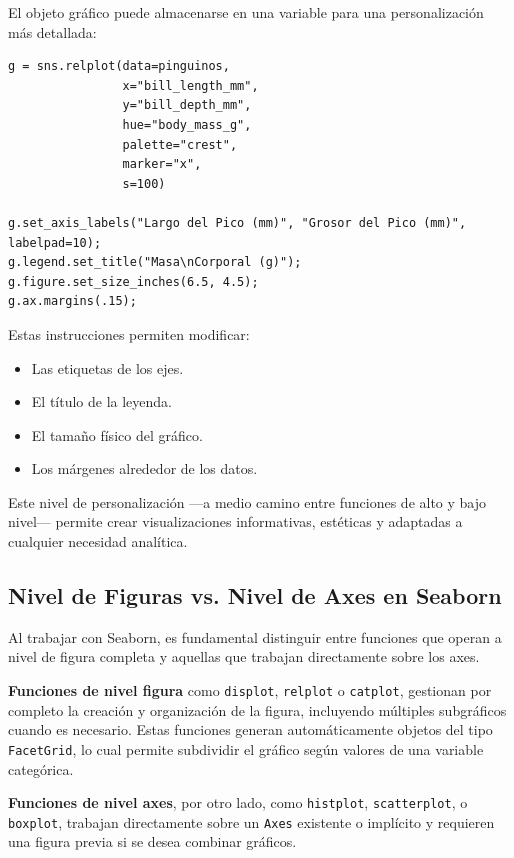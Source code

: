 \documentclass{article}
\theoremstyle{nonumberplain}
\begin{document}
El objeto gráfico puede almacenarse en una variable para una personalización más detallada:

\begin{verbatim}
g = sns.relplot(data=pinguinos,
                x="bill_length_mm",
                y="bill_depth_mm",
                hue="body_mass_g",
                palette="crest",
                marker="x",
                s=100)

g.set_axis_labels("Largo del Pico (mm)", "Grosor del Pico (mm)", labelpad=10);
g.legend.set_title("Masa\nCorporal (g)");
g.figure.set_size_inches(6.5, 4.5);
g.ax.margins(.15);
\end{verbatim}

Estas instrucciones permiten modificar:
\begin{itemize}
    \item Las etiquetas de los ejes.
    \item El título de la leyenda.
    \item El tamaño físico del gráfico.
    \item Los márgenes alrededor de los datos.
\end{itemize}

Este nivel de personalización —a medio camino entre funciones de alto y bajo nivel— permite crear visualizaciones informativas, estéticas y adaptadas a cualquier necesidad analítica.

\subsection*{Nivel de Figuras vs. Nivel de Axes en Seaborn}

Al trabajar con Seaborn, es fundamental distinguir entre funciones que operan a nivel de figura completa y aquellas que trabajan directamente sobre los axes.

\textbf{Funciones de nivel figura} como \texttt{displot}, \texttt{relplot} o \texttt{catplot}, gestionan por completo la creación y organización de la figura, incluyendo múltiples subgráficos cuando es necesario. Estas funciones generan automáticamente objetos del tipo \texttt{FacetGrid}, lo cual permite subdividir el gráfico según valores de una variable categórica.

\textbf{Funciones de nivel axes}, por otro lado, como \texttt{histplot}, \texttt{scatterplot}, o \texttt{boxplot}, trabajan directamente sobre un \texttt{Axes} existente o implícito y requieren una figura previa si se desea combinar gráficos.
\end{document}
